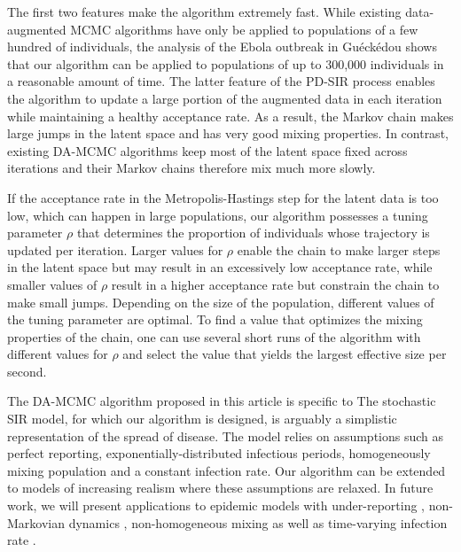 \documentclass[11pt]{article}
\begin{document}
	The first two features make the algorithm extremely fast. While existing data-augmented MCMC algorithms have only be applied to populations of a few hundred of individuals, the analysis of the Ebola outbreak in Gu\'eck\'edou shows that our algorithm can be applied to populations of up to 300,000 individuals in a reasonable amount of time.	
	The latter feature of the PD-SIR process enables the algorithm to update a large portion of the augmented data in each iteration while maintaining a healthy acceptance rate. As a result, the Markov chain makes large jumps in the latent space and has very good mixing properties. In contrast, existing DA-MCMC algorithms keep most of the latent space fixed across iterations \cite{Gibson.1998, ONeill.1999, Fintzi.2017} and their Markov chains therefore mix much more slowly.
	
	If the acceptance rate in the Metropolis-Hastings step for the latent data is too low, which can happen in large populations, our algorithm possesses a tuning parameter $\rho$ that determines the proportion of individuals whose trajectory is updated per iteration. Larger values for $\rho$ enable the chain to make larger steps in the latent space but may result in an excessively low acceptance rate, while smaller values of $\rho$ result in a higher acceptance rate but constrain the chain to make small jumps. Depending on the size of the population, different values of the tuning parameter are optimal. To find a value that optimizes the mixing properties of the chain, one can use several short runs of the algorithm with different values for $\rho$ and select the value that yields the largest effective size per second.
	
	
	The DA-MCMC algorithm proposed in this article is specific to 
	The stochastic SIR model, for which our algorithm is designed, is arguably a simplistic representation of the spread of disease. The model relies on assumptions such as perfect reporting, exponentially-distributed infectious periods, homogeneously mixing population and a constant infection rate. Our algorithm can be extended to models of increasing realism where these assumptions are relaxed. In future work, we will present applications to epidemic models with under-reporting \cite{Fintzi.2017}, non-Markovian dynamics \cite{Streftaris.2002}, non-homogeneous mixing \cite{Severo.1969} as well as time-varying infection rate \cite{Kypraios.2018}.
	
\end{document}
